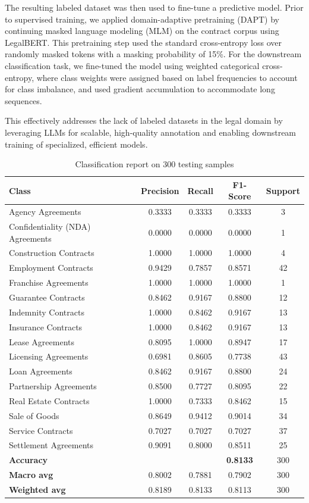 \documentclass[11pt, oneside]{article}   	%
\begin{document}
The resulting labeled dataset was then used to fine-tune a predictive model. Prior to supervised training, we applied domain-adaptive pretraining (DAPT) by continuing masked language modeling (MLM) on the contract corpus using LegalBERT. This pretraining step used the standard cross-entropy loss over randomly masked tokens with a masking probability of 15\%. For the downstream classification task, we fine-tuned the model using weighted categorical cross-entropy, where class weights were assigned based on label frequencies to account for class imbalance, and used gradient accumulation to accommodate long sequences.

This effectively addresses the lack of labeled datasets in the legal domain by leveraging LLMs for scalable, high-quality annotation and enabling downstream training of specialized, efficient models.

\begin{table}[htbp]
\centering
\caption{Classification report on 300 testing samples}
\begin{tabular}{lcccc}
\hline
\textbf{Class} & \textbf{Precision} & \textbf{Recall} & \textbf{F1-Score} & \textbf{Support} \\
\hline
Agency Agreements & 0.3333 & 0.3333 & 0.3333 & 3 \\
Confidentiality (NDA) Agreements & 0.0000 & 0.0000 & 0.0000 & 1 \\
Construction Contracts & 1.0000 & 1.0000 & 1.0000 & 4 \\
Employment Contracts & 0.9429 & 0.7857 & 0.8571 & 42 \\
Franchise Agreements & 1.0000 & 1.0000 & 1.0000 & 1 \\
Guarantee Contracts & 0.8462 & 0.9167 & 0.8800 & 12 \\
Indemnity Contracts & 1.0000 & 0.8462 & 0.9167 & 13 \\
Insurance Contracts & 1.0000 & 0.8462 & 0.9167 & 13 \\
Lease Agreements & 0.8095 & 1.0000 & 0.8947 & 17 \\
Licensing Agreements & 0.6981 & 0.8605 & 0.7738 & 43 \\
Loan Agreements & 0.8462 & 0.9167 & 0.8800 & 24 \\
Partnership Agreements & 0.8500 & 0.7727 & 0.8095 & 22 \\
Real Estate Contracts & 1.0000 & 0.7333 & 0.8462 & 15 \\
Sale of Goods & 0.8649 & 0.9412 & 0.9014 & 34 \\
Service Contracts & 0.7027 & 0.7027 & 0.7027 & 37 \\
Settlement Agreements & 0.9091 & 0.8000 & 0.8511 & 25 \\
\hline
\textbf{Accuracy} & & & \textbf{0.8133} & 300 \\
\textbf{Macro avg} & 0.8002 & 0.7881 & 0.7902 & 300 \\
\textbf{Weighted avg} & 0.8189 & 0.8133 & 0.8113 & 300 \\
\hline
\end{tabular}
\label{tab:classification_report}
\end{table}
\end{document}
